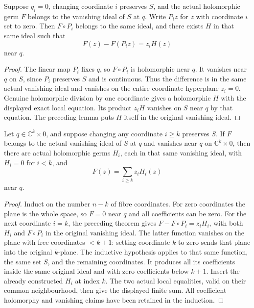 \begin{theorem}
\label{hir:actual-cylinder-one-coordinate-hadamard}
\leanok
Suppose $q_i=0$, changing coordinate $i$ preserves $S$, and the actual
holomorphic germ $F$ belongs to the vanishing ideal of $S$ at $q$. Write
$P_i z$ for $z$ with coordinate $i$ set to zero. Then $F\circ P_i$ belongs
to the same ideal, and there exists $H$ in that same ideal such that
\[
 F(z)-F(P_i z)=z_iH(z)
\]
near $q$.
\end{theorem}
\begin{proof}
The linear map $P_i$ fixes $q$, so $F\circ P_i$ is holomorphic near $q$.
It vanishes near $q$ on $S$, since $P_i$ preserves $S$ and is continuous.
Thus the difference is in the same actual vanishing ideal and vanishes on
the entire coordinate hyperplane $z_i=0$. Genuine holomorphic division by
one coordinate gives a holomorphic $H$ with the displayed exact local
equation. Its product $z_iH$ vanishes on $S$ near $q$ by that equation.
The preceding lemma puts $H$ itself in the original vanishing ideal.
\end{proof}

\begin{theorem}
\label{hir:actual-cylinder-relative-hadamard-whole}
\leanok
Let $q\in\mathbb C^k\times0$, and suppose changing any coordinate $i\ge k$
preserves $S$. If $F$ belongs to the actual vanishing ideal of $S$ at $q$
and vanishes near $q$ on $\mathbb C^k\times0$, then there are actual
holomorphic germs $H_i$, each in that same vanishing ideal, with $H_i=0$
for $i<k$, and
\[
 F(z)=\sum_{i\ge k}z_iH_i(z)
\]
near $q$.
\end{theorem}
\begin{proof}
Induct on the number $n-k$ of fibre coordinates. For zero coordinates the
plane is the whole space, so $F=0$ near $q$ and all coefficients can be zero.
For the next coordinate $i=k$, the preceding theorem gives
$F-F\circ P_i=z_iH_i$, with both $H_i$ and $F\circ P_i$ in the original
vanishing ideal. The latter function vanishes on the plane with free
coordinates $<k+1$: setting coordinate $k$ to zero sends that plane into
the original $k$-plane. The inductive hypothesis applies to that same
function, the same set $S$, and the remaining coordinates. It produces
all its coefficients inside the same original ideal and with zero
coefficients below $k+1$. Insert the already constructed $H_i$ at index
$k$. The two actual local equalities, valid on their common neighbourhood,
then give the displayed finite sum. All coefficient holomorphy and
vanishing claims have been retained in the induction.
\end{proof}

